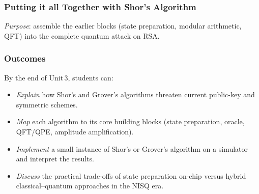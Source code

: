 
\subsubsection{Putting it all Together with Shor's Algorithm}

\emph{Purpose}: assemble the earlier blocks 
(state preparation, modular arithmetic, QFT)
into the complete quantum attack on RSA.



\subsubsection{Outcomes}

By the end of Unit 3, students can:
\begin{itemize}
	\item \emph{Explain} how Shor's and Grover's algorithms threaten current public-key and symmetric schemes.

	\item \emph{Map} each algorithm to its core building blocks (state preparation, oracle, QFT/QPE, amplitude amplification).

	\item \emph{Implement} a small instance of Shor's or Grover's algorithm on a simulator and interpret the results.

	\item \emph{Discuss} the practical trade-offs of state preparation on-chip versus hybrid classical–quantum approaches in the NISQ era.
\end{itemize}



